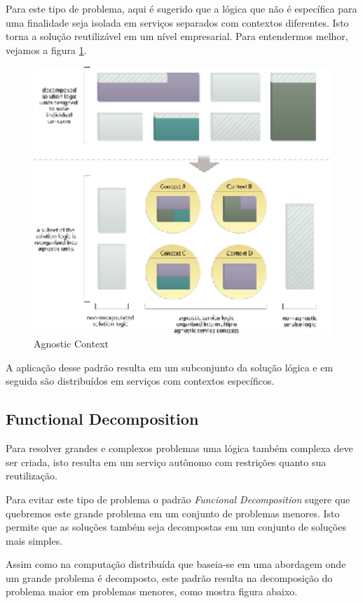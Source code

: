 \documentclass[12pt]{article}
\begin{document}
Para este tipo de problema, aqui é sugerido que a lógica que não é específica para uma finalidade seja isolada em serviços separados com contextos diferentes. Isto torna a solução reutilizável em um nível empresarial. Para entendermos melhor, vejamos a figura \ref{fig:2}.

\begin{figure}[H]
	\centering
	\includegraphics[width=14cm]{img/fig2.eps}
	\caption{Agnostic Context}
	\label{fig:2}
\end{figure}

A aplicação desse padrão resulta em um subconjunto da solução lógica e em seguida são distribuídos em serviços com contextos específicos.

\subsection{Functional Decomposition}

Para resolver grandes e complexos problemas uma lógica também complexa deve ser criada, isto resulta em um serviço autônomo com restrições quanto sua reutilização.

Para evitar este tipo de problema o padrão \textit{Funcional Decomposition} sugere que quebremos este grande problema em um conjunto de problemas menores. Isto permite que as soluções também seja decompostas em um conjunto de soluções mais simples.

Assim como na computação distribuída que baseia-se em uma abordagem  onde um grande problema é decomposto, este padrão resulta na decomposição do problema maior em problemas menores, como mostra figura abaixo.
\end{document}
